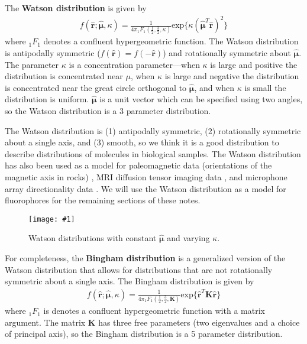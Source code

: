 \documentclass[11pt]{article}
\providecommand{\mb}[1]{\mathbf{#1}}
\providecommand{\mh}[1]{\mathbf{\hat{#1}}}
\providecommand{\bs}[1]{\boldsymbol{#1}}
\providecommand{\fig}[4]{
\begin{figure}[h]
 \captionsetup{width=1.0\linewidth}
 \centering
 \texttt{[image: \#1]}
 \caption{#3}
 \label{fig:#4}
\end{figure}
}
\begin{document}
The \textbf{Watson distribution} \cite{sra2007modeling, jupp} is given by
\begin{align*}
  f(\mh{r}; \bs{\hat{\mu}}, \kappa) = \frac{1}{4\pi{}_1F_1\left(\frac{1}{2}, \frac{3}{2}, \kappa\right)}\text{exp}\{\kappa (\bs{\hat{\mu}}^T\mh{r})^2\}
\end{align*}
where ${}_1F_1$ denotes a confluent hypergeometric function. The Watson
distribution is antipodally symmetric ($f(\mh{r}) = f(-\mh{r})$) and
rotationally symmetric about $\bs{\hat{\mu}}$. The parameter $\kappa$ is a
concentration parameter---when $\kappa$ is large and positive the distribution
is concentrated near $\mu$, when $\kappa$ is large and negative the distribution
is concentrated near the great circle orthogonal to $\bs{\hat{\mu}}$, and when
$\kappa$ is small the distribution is uniform. $\bs{\hat{\mu}}$ is a unit vector
which can be specified using two angles, so the Watson distribution is a 3
parameter distribution.

The Watson distribution is (1) antipodally symmetric, (2) rotationally symmetric
about a single axis, and (3) smooth, so we think it is a good distribution to
describe distributions of molecules in biological samples. The Watson
distribution has also been used as a model for paleomagnetic data (orientations
of the magnetic axis in rocks) \cite{Love2007}, MRI diffusion tensor imaging
data \cite{Jespersen2012}, and microphone array directionality data
\cite{alex}. We will use the Watson distribution as a model for fluorophores for
the remaining sections of these notes.

\fig{../figures/watson.pdf}{1.0}{Watson distributions with constant
  $\bs{\hat{\mu}}$ and varying $\kappa$. }{watson}

For completeness, the \textbf{Bingham distribution} \cite{sra2007modeling, jupp}
is a generalized version of the Watson distribution that allows for
distributions that are not rotationally symmetric about a single axis. The
Bingham distribution is given by
\begin{align}
  f(\mh{r}; \bs{\hat{\mu}}, \kappa) = \frac{1}{4\pi{}_1F_1\left(\frac{1}{2}, \frac{3}{2}, \mb{K}\right)}\text{exp}\{\mh{r}^T\mb{K}\mh{r}\}
\end{align}
where ${}_1F_1$ is denotes a confluent hypergeometric function with a matrix
argument. The matrix $\mb{K}$ has three free parameters (two eigenvalues and a
choice of principal axis), so the Bingham distribution is a 5 parameter
distribution.
\end{document}
